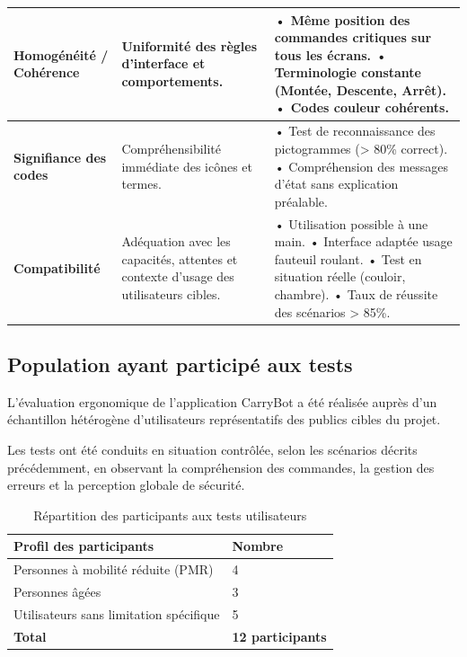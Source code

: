 \documentclass[12pt,a4paper]{article}
\begin{document}
\begin{longtable}{|p{3.2cm}|p{4.3cm}|p{6.8cm}|}
\textbf{Homogénéité / Cohérence} &
Uniformité des règles d’interface et comportements. &
• Même position des commandes critiques sur tous les écrans.  
• Terminologie constante (Montée, Descente, Arrêt).  
• Codes couleur cohérents. \\
\hline

\textbf{Signifiance des codes} &
Compréhensibilité immédiate des icônes et termes. &
• Test de reconnaissance des pictogrammes (> 80\% correct).  
• Compréhension des messages d’état sans explication préalable. \\
\hline

\textbf{Compatibilité} &
Adéquation avec les capacités, attentes et contexte d’usage des utilisateurs cibles. &
• Utilisation possible à une main.  
• Interface adaptée usage fauteuil roulant.  
• Test en situation réelle (couloir, chambre).  
• Taux de réussite des scénarios > 85\%. \\
\hline

\end{longtable}


\subsection*{Population ayant participé aux tests}

L’évaluation ergonomique de l’application CarryBot a été réalisée
auprès d’un échantillon hétérogène d’utilisateurs représentatifs
des publics cibles du projet.

Les tests ont été conduits en situation contrôlée,
selon les scénarios décrits précédemment,
en observant la compréhension des commandes,
la gestion des erreurs et la perception globale de sécurité.

\begin{table}[H]
\centering
\renewcommand{\arraystretch}{1.3}
\setlength{\tabcolsep}{8pt}
\begin{tabular}{|p{6cm}|p{4cm}|}
\hline
\rowcolor{gray!15}
\textbf{Profil des participants} & \textbf{Nombre} \\
\hline
Personnes à mobilité réduite (PMR) & 4 \\
\hline
Personnes âgées & 3 \\
\hline
Utilisateurs sans limitation spécifique & 5 \\
\hline
\textbf{Total} & \textbf{12 participants} \\
\hline
\end{tabular}
\caption{Répartition des participants aux tests utilisateurs}
\end{table}
\end{document}
